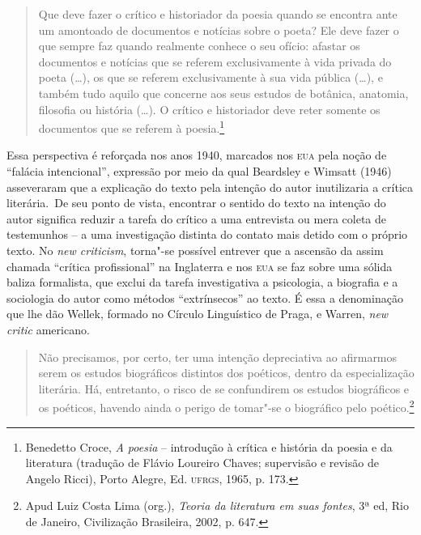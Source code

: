 \begin{quote}
Que deve fazer o crítico e historiador da poesia quando se encontra ante
um amontoado de documentos e notícias sobre o poeta? Ele deve fazer o
que sempre faz quando realmente conhece o seu ofício: afastar os
documentos e notícias que se referem exclusivamente à vida privada do
poeta (\ldots{}), os que se referem exclusivamente à sua vida pública (\ldots{}),
e também tudo aquilo que concerne aos seus estudos de botânica,
anatomia, filosofia ou história (\ldots{}). O crítico e historiador deve
reter somente os documentos que se referem à poesia.\footnote{Benedetto
  Croce, \emph{A poesia} -- introdução à crítica e história da poesia e
  da literatura (tradução de Flávio Loureiro Chaves; supervisão e
  revisão de Angelo Ricci), Porto Alegre, Ed. \textsc{ufrgs}, 1965, p.
  173.}
\end{quote}

Essa perspectiva é reforçada nos anos 1940, marcados nos \textsc{eua}
pela noção de ``falácia intencional'', expressão por meio da qual
Beardsley e Wimsatt (1946) asseveraram que a explicação do texto pela
intenção do autor inutilizaria a crítica literária.~De seu ponto de
vista, encontrar o sentido do texto na intenção do autor significa
reduzir a tarefa do crítico a uma entrevista ou mera coleta de
testemunhos -- a uma investigação distinta do contato mais detido com o
próprio texto. No \emph{new criticism}, torna"-se possível entrever que a
ascensão da assim chamada ``crítica profissional'' na Inglaterra e nos
\textsc{eua} se faz sobre uma sólida baliza formalista, que exclui da
tarefa investigativa a psicologia, a biografia e a sociologia do autor
como métodos ``extrínsecos'' ao texto. É essa a denominação que lhe dão
Wellek, formado no Círculo Linguístico de Praga, e Warren, \emph{new
critic} americano.

\begin{quote}
Não precisamos, por certo, ter uma intenção depreciativa ao afirmarmos
serem os estudos biográficos distintos dos poéticos, dentro da
especialização literária. Há, entretanto, o risco de se confundirem os
estudos biográficos e os poéticos, havendo ainda o perigo de tomar"-se o
biográfico pelo poético.\footnote{Apud Luiz Costa Lima
  (org.), \emph{Teoria da literatura em suas fontes}, 3ª ed, Rio de
  Janeiro, Civilização Brasileira, 2002, p. 647.}
\end{quote}


